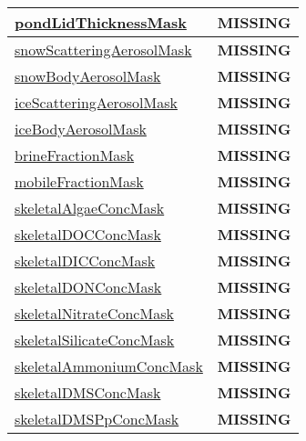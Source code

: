{\begin{center}
\begin{longtable}{| p{2.0in} | p{4.0in} |}
    \hline
    \hyperref[subsec:var_sec_tracer_masks_pondLidThicknessMask]{pondLidThicknessMask} & {\bf \color{red} MISSING} \\
    \hline
    \hyperref[subsec:var_sec_tracer_masks_snowScatteringAerosolMask]{snowScatteringAerosolMask} & {\bf \color{red} MISSING} \\
    \hline
    \hyperref[subsec:var_sec_tracer_masks_snowBodyAerosolMask]{snowBodyAerosolMask} & {\bf \color{red} MISSING} \\
    \hline
    \hyperref[subsec:var_sec_tracer_masks_iceScatteringAerosolMask]{iceScatteringAerosolMask} & {\bf \color{red} MISSING} \\
    \hline
    \hyperref[subsec:var_sec_tracer_masks_iceBodyAerosolMask]{iceBodyAerosolMask} & {\bf \color{red} MISSING} \\
    \hline
    \hyperref[subsec:var_sec_tracer_masks_brineFractionMask]{brineFractionMask} & {\bf \color{red} MISSING} \\
    \hline
    \hyperref[subsec:var_sec_tracer_masks_mobileFractionMask]{mobileFractionMask} & {\bf \color{red} MISSING} \\
    \hline
    \hyperref[subsec:var_sec_tracer_masks_skeletalAlgaeConcMask]{skeletalAlgaeConcMask} & {\bf \color{red} MISSING} \\
    \hline
    \hyperref[subsec:var_sec_tracer_masks_skeletalDOCConcMask]{skeletalDOCConcMask} & {\bf \color{red} MISSING} \\
    \hline
    \hyperref[subsec:var_sec_tracer_masks_skeletalDICConcMask]{skeletalDICConcMask} & {\bf \color{red} MISSING} \\
    \hline
    \hyperref[subsec:var_sec_tracer_masks_skeletalDONConcMask]{skeletalDONConcMask} & {\bf \color{red} MISSING} \\
    \hline
    \hyperref[subsec:var_sec_tracer_masks_skeletalNitrateConcMask]{skeletalNitrateConcMask} & {\bf \color{red} MISSING} \\
    \hline
    \hyperref[subsec:var_sec_tracer_masks_skeletalSilicateConcMask]{skeletalSilicateConcMask} & {\bf \color{red} MISSING} \\
    \hline
    \hyperref[subsec:var_sec_tracer_masks_skeletalAmmoniumConcMask]{skeletalAmmoniumConcMask} & {\bf \color{red} MISSING} \\
    \hline
    \hyperref[subsec:var_sec_tracer_masks_skeletalDMSConcMask]{skeletalDMSConcMask} & {\bf \color{red} MISSING} \\
    \hline
    \hyperref[subsec:var_sec_tracer_masks_skeletalDMSPpConcMask]{skeletalDMSPpConcMask} & {\bf \color{red} MISSING} \\

\end{longtable}
\end{center}}
